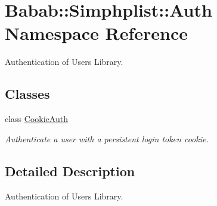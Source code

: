 \hypertarget{namespaceBabab_1_1Simphplist_1_1Auth}{\section{Babab\+:\+:Simphplist\+:\+:Auth Namespace Reference}
\label{namespaceBabab_1_1Simphplist_1_1Auth}
}


Authentication of Users Library.  


\subsection*{Classes}
\begin{DoxyCompactItemize}
\item 
class \hyperlink{classBabab_1_1Simphplist_1_1Auth_1_1CookieAuth}{Cookie\+Auth}
\begin{DoxyCompactList}\small\item\em Authenticate a user with a persistent login token cookie. \end{DoxyCompactList}\end{DoxyCompactItemize}


\subsection{Detailed Description}
Authentication of Users Library. 